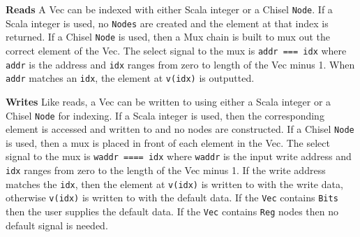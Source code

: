\textbf{Reads} A Vec can be indexed with either Scala integer or a
Chisel {\tt Node}. If a Scala integer is used, no {\tt Nodes} are
created and the element at that index is returned. If a Chisel 
{\tt Node} is used, then a Mux chain is built to mux out the correct
element of the Vec. The select signal to the mux is {\tt addr === idx}
where {\tt addr} is the address and {\tt idx} ranges from zero to
length of the Vec minus 1. When {\tt addr} matches an {\tt idx}, the
element at {\tt v(idx)} is outputted.

\textbf{Writes} Like reads, a Vec can be written to using either a
Scala integer or a Chisel {\tt Node} for indexing. If a Scala integer
is used, then the corresponding element is accessed and written to and
no nodes are constructed. If a Chisel {\tt Node} is used, then a mux
is placed in front of each element in the Vec. The select signal to
the mux is {\tt waddr ==== idx} where {\tt waddr} is the input write
address and {\tt idx} ranges from zero to the length of the Vec minus
1. If the write address matches the {\tt idx}, then the element at
{\tt v(idx)} is written to with the write data, otherwise {\tt v(idx)}
is written to with the default data. If the {\tt Vec} contains 
{\tt Bits} then the user supplies the default data. If the {\tt Vec}
contains {\tt Reg} nodes then no default signal is needed.
